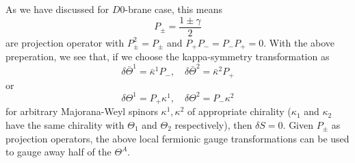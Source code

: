\documentclass[graybox,envcountchap,sectrefs]{svmono}
\begin{document}
As we have discussed for $D0$-brane case, this means
\begin{equation}
P_{\pm}=\frac{1 \pm \gamma}{2}
\end{equation}
are projection operator with $P_{\pm}^{2}=P_{\pm}$ and $P_{+} P_{-}=P_{-} P_{+}=0$.
With the above preperation, we see that, if we choose the kappa-symmetry transformation as
\begin{equation}
\delta \bar{\Theta}^{1}=\bar{\kappa}^{1} P_{-}, \quad \delta \bar{\Theta}^{2}=\bar{\kappa}^{2} P_{+}
\end{equation}
or
\[
\delta \Theta^{1}=P_{+} \kappa^{1}, \quad \delta \Theta^{2}=P_{-} \kappa^{2}
\]
for arbitrary Majorana-Weyl spinors $\kappa^{1}, \kappa^{2}$ of appropriate chirality ($\kappa_1$ and $\kappa_2$ have the same chirality with $\Theta_1$ and $\Theta_2$ respectively), then $\delta S=0$.
Given $P_{\pm}$ as projection operators, the above local fermionic gauge transformations can be used to gauge away half of the $\Theta^{A}$.
\end{document}
